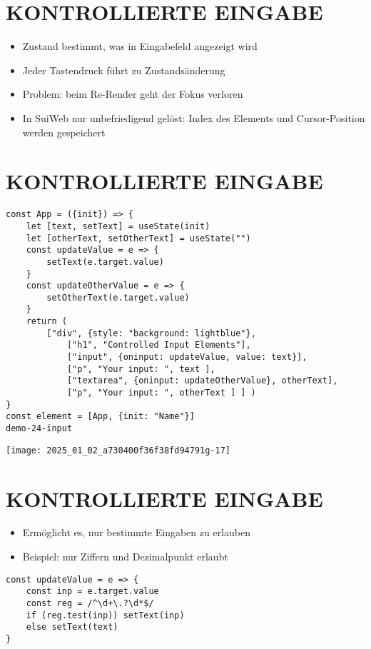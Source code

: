 \section*{KONTROLLIERTE EINGABE}
\begin{itemize}
  \item Zustand bestimmt, was in Eingabefeld angezeigt wird
  \item Jeder Tastendruck führt zu Zustandsänderung
  \item Problem: beim Re-Render geht der Fokus verloren
  \item In SuiWeb nur unbefriedigend gelöst: Index des Elements und Cursor-Position werden gespeichert
\end{itemize}

\section*{KONTROLLIERTE EINGABE}
\begin{verbatim}
const App = ({init}) => {
    let [text, setText] = useState(init)
    let [otherText, setOtherText] = useState("")
    const updateValue = e => {
        setText(e.target.value)
    }
    const updateOtherValue = e => {
        setOtherText(e.target.value)
    }
    return (
        ["div", {style: "background: lightblue"},
            ["h1", "Controlled Input Elements"],
            ["input", {oninput: updateValue, value: text}],
            ["p", "Your input: ", text ],
            ["textarea", {oninput: updateOtherValue}, otherText],
            ["p", "Your input: ", otherText ] ] )
}
const element = [App, {init: "Name"}]
demo-24-input
\end{verbatim}

\begin{center}
\texttt{[image: 2025\_01\_02\_a730400f36f38fd94791g-17]}
\end{center}

\section*{KONTROLLIERTE EINGABE}
\begin{itemize}
  \item Ermöglicht es, nur bestimmte Eingaben zu erlauben
  \item Beispiel: nur Ziffern und Dezimalpunkt erlaubt
\end{itemize}

\begin{verbatim}
const updateValue = e => {
    const inp = e.target.value
    const reg = /^\d+\.?\d*$/
    if (reg.test(inp)) setText(inp)
    else setText(text)
}
\end{verbatim}

